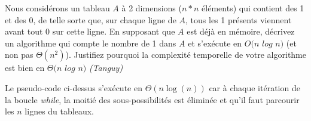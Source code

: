 Nous considérons un tableau $A$ à 2 dimensions ($n * n$ éléments) qui contient des 1 et des 0, de telle sorte que, sur chaque ligne de $A$, tous les 1 présents viennent avant tout 0 sur cette ligne.
En supposant que $A$ est déjà en mémoire, décrivez un algorithme qui compte le nombre de 1 dans $A$ et s'exécute en $O(n$ $log$ $n)$ (et non pas $\Theta(n^2)$).
Justifiez pourquoi la complexité temporelle  de votre algorithme est bien en $\Theta(n$ $log$ $n)$ \textit{(Tanguy)}



Le pseudo-code ci-dessus s'exécute en $\Theta(n\log(n))$ car à chaque itération de la boucle \textit{while}, la moitié des sous-possibilités est éliminée et qu'il faut parcourir les $n$ lignes du tableaux.